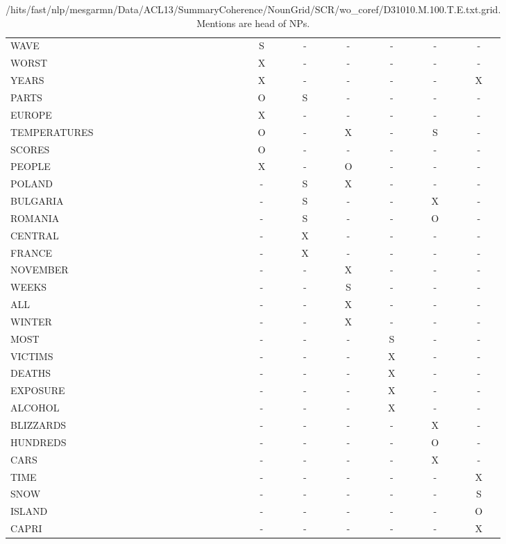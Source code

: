 \begin{table}
\centering
\begin{tabular}{lcccccc}
\hline
WAVE & S & - & - & - & - & - \\
WORST & X & - & - & - & -  &- \\
YEARS  &X  & -  &-  &-  &-  &X \\
PARTS  &O & S  &-  &-  &-  &-  \\
EUROPE  &X & - & - & - & - & - \\
TEMPERATURES  &O  &-  &X  &-  &S  &-  \\
SCORES  &O  &-  &-  &-  &-  &-  \\
PEOPLE  &X  &- & O  &-  &-  &-  \\
POLAND  &-  &S & X  &-  & -  &-  \\
BULGARIA  &-  &S  &-  &-  &X  &-  \\
ROMANIA  &-  &S  &-  &-  &O  &-  \\
CENTRAL  &-  &X  &- & - & - & -  \\
FRANCE  &-  &X  &-  &- & - & -  \\
NOVEMBER  &-  &- & X  &-  &-  &-  \\
WEEKS  &-  &-  &S  &-  &-  &-  \\
ALL  &-  &-  &X  &-  &-  &-  \\
WINTER  &-  & -  &X  &-  &-  &-  \\
MOST  &-  &-  &-  &S  &- & -  \\
VICTIMS  &-  &-  &-  &X  &-  &-  \\
DEATHS  &-  &-  &- & X  &-  &-  \\
EXPOSURE  &- & - & -  &X  &-  &-  \\
ALCOHOL  &-  &-  &-  &X  &-  &-  \\
BLIZZARDS  &-  &-  &-  &-  &X  &-  \\
HUNDREDS  &-  &-  &-  &-  &O  & -  \\
CARS  &-  &-  &-  &-  &X  &-  \\
TIME  &-  &-  &-  &-  &-  &X  \\
SNOW  &-  &- & - & - & - & S  \\
ISLAND & - & - & - & - & - & O  \\
CAPRI & - & - & - & - & - & X  \\
\hline
\end{tabular}
\caption{/hits/fast/nlp/mesgarmn/Data/ACL13/SummaryCoherence/NounGrid/SCR/wo\_coref/D31010.M.100.T.E.txt.grid. Mentions are head of NPs.}
\end{table}

